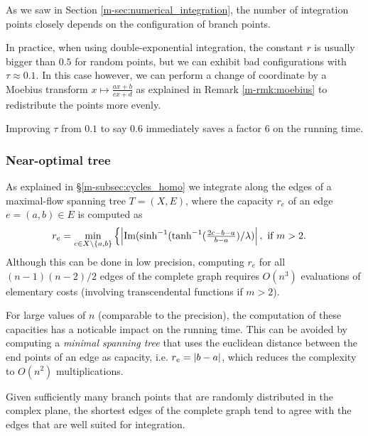 \documentclass[main.tex]{subfiles}
\begin{document}
   As we saw in Section \ref{m-sec:numerical_integration}, the number of integration points
   closely depends on the configuration of branch points.

   In practice, when using double-exponential integration, the constant $r$ is usually bigger than $0.5$
   for random points, but we can exhibit bad configurations with $τ\approx 0.1$.
   In this case however, we can perform a change of coordinate by a Moebius transform
   $x\mapsto \frac{ax+b}{cx+d}$ as explained in Remark \ref{m-rmk:moebius} to redistribute the points more evenly.

   Improving $τ$ from $0.1$ to say $0.6$ immediately saves a factor $6$ on the running time.

   \subsubsection{Near-optimal tree}
    As explained in \S \ref{m-subsec:cycles_homo} we integrate along the edges of a maximal-flow spanning tree $T = (X,E)$, where the capacity $r_e$ of an edge $e = (a,b) \in E$ is computed as
    \begin{equation*}
     r_e =  \min_{c \in X \setminus \{ a,b\}} \begin{cases}
         \left| \operatorname{Im}(\sinh^{-1}(\tanh^{-1}(\frac{2c - b -a}{b-a})/\lambda) \right|, \text{ if $m>2$.}
            \end{cases}
    \end{equation*}
    Although this can be done in low precision, computing $r_e$ for all $(n-1)(n-2)/2$ edges of the complete graph
    requires $O(n^3)$ evaluations of elementary costs (involving transcendental functions if $m>2$).

    For large values of $n$ (comparable to the precision), the computation of
    these capacities has a noticable impact on the running time. This can be
    avoided by computing a \emph{minimal spanning tree} that uses the euclidean
    distance between the end points of an edge as capacity, i.e.
    $r_e = \left|b-a\right|$, which reduces the complexity to $O(n^2)$
    multiplications.

    Given sufficiently many branch points that are randomly distributed in the
    complex plane, the shortest edges of the complete graph tend to agree with
    the edges that are well suited for integration.
\end{document}
